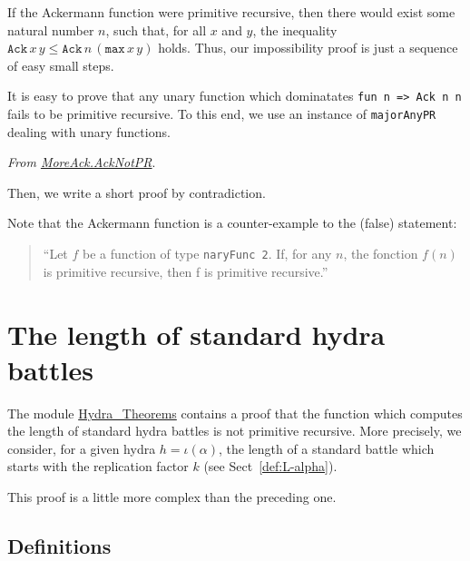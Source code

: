 If the Ackermann function were primitive recursive, then there would exist some natural number $n$, such that, for all $x$ and $y$, the inequality 
$\texttt{Ack}\,x\,y\leq \texttt{Ack}\,n\,(\texttt{max}\,x\,y)$ holds.
Thus, our impossibility proof is just a sequence of easy small steps.



\begin{remark}
It is easy to prove that any unary function which dominatates \texttt{fun n => Ack n n} fails to be primitive recursive. To this end, we use an instance of \texttt{majorAnyPR} dealing with unary functions.

\vspace{4pt}
\noindent

\emph{From \href{../theories/html/hydras.MoreAck.AckNotPR.html}{MoreAck.AckNotPR}}.



Then, we write  a short proof by contradiction.



\end{remark}

\begin{remark}
Note that the Ackermann function is a counter-example to the (false) statement:
\begin{quote}
{\color{red}
  ``Let $f$ be a function of type \texttt{naryFunc\,2}. If, for any $n$, the fonction $f(n)$ is primitive recursive, then f is primitive recursive.''}
\end{quote}
\end{remark}


\section{The length of standard hydra battles}
\label{sect:battle-length-notPR}

The module \href{../theories/html/hydras.Hydra.Hydra_Theorems.html}{Hydra\_Theorems} contains a proof that the function which computes the length of standard hydra battles is not primitive recursive. More precisely, we consider, for a given hydra $h=\iota(\alpha)$, the length of a standard battle which starts with the replication factor $k$ (see Sect~\vref{def:L-alpha}).

This proof is  a little more complex than the preceding one.

\subsection{Definitions}

